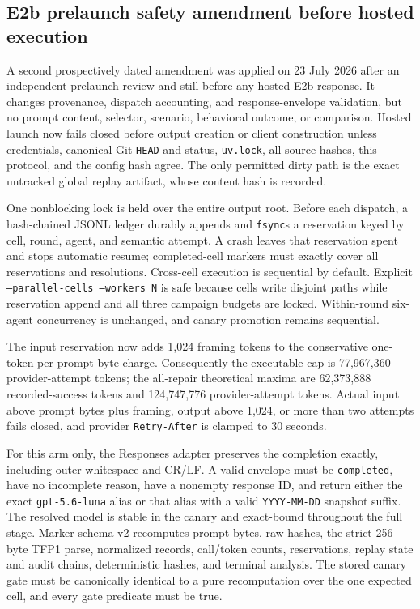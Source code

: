 \documentclass[11pt]{article}
\newcommand{\code}[1]{\texttt{#1}}
\begin{document}
\subsection{E2b prelaunch safety amendment before hosted execution}

A second prospectively dated amendment was applied on 23 July 2026 after an
independent prelaunch review and still before any hosted E2b response.  It
changes provenance, dispatch accounting, and response-envelope validation,
but no prompt content, selector, scenario, behavioral outcome, or comparison.
Hosted launch now fails closed before output creation or client construction
unless credentials, canonical Git \code{HEAD} and status, \code{uv.lock}, all
source hashes, this protocol, and the config hash agree.  The only permitted
dirty path is the exact untracked global replay artifact, whose content hash
is recorded.

One nonblocking lock is held over the entire output root.  Before each
dispatch, a hash-chained JSONL ledger durably appends and \code{fsync}s a
reservation keyed by cell, round, agent, and semantic attempt.  A crash leaves
that reservation spent and stops automatic resume; completed-cell markers
must exactly cover all reservations and resolutions.  Cross-cell execution is
sequential by default.  Explicit \code{--parallel-cells --workers N} is safe
because cells write disjoint paths while reservation append and all three
campaign budgets are locked.  Within-round six-agent concurrency is
unchanged, and canary promotion remains sequential.

The input reservation now adds 1,024 framing tokens to the conservative
one-token-per-prompt-byte charge.  Consequently the executable cap is
77,967,360 provider-attempt tokens; the all-repair theoretical maxima are
62,373,888 recorded-success tokens and 124,747,776 provider-attempt tokens.
Actual input above prompt bytes plus framing, output above 1,024, or more than
two attempts fails closed, and provider \code{Retry-After} is clamped to 30
seconds.

For this arm only, the Responses adapter preserves the completion exactly,
including outer whitespace and CR/LF.  A valid envelope must be
\code{completed}, have no incomplete reason, have a nonempty response ID, and
return either the exact \code{gpt-5.6-luna} alias or that alias with a valid
\code{YYYY-MM-DD} snapshot suffix.  The resolved model is stable in the
canary and exact-bound throughout the full stage.  Marker schema v2
recomputes prompt bytes, raw hashes, the strict 256-byte TFP1 parse, normalized
records, call/token counts, reservations, replay state and audit chains,
deterministic hashes, and terminal analysis.  The stored canary gate must be
canonically identical to a pure recomputation over the one expected cell, and
every gate predicate must be true.
\end{document}
